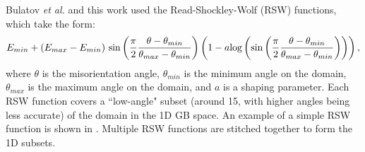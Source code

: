 \documentclass[twoside,senior]{BYUPhys}
\begin{document}
Bulatov \emph{et al.} and this work used the Read-Shockley-Wolf (RSW) functions,\cite{wolf1989} which take the form:
\begin{equation}
E_{min} + (E_{max} - E_{min})\ \textnormal{sin}\left(\frac{\pi}{2}\frac{\theta-\theta_{min}}{\theta_{max} - \theta_{min}}\right)\left(1-a\textnormal{log}\left(\textnormal{sin}\left(\frac{\pi}{2}\frac{\theta-\theta_{min}}{\theta_{max} - \theta_{min}}\right)\right)\right),
\end{equation}
where $\theta$ is the misorientation angle, $\theta_{min}$ is the minimum angle on the domain, $\theta_{max}$ is the maximum angle on the domain, and $a$ is a shaping parameter.  Each RSW function covers a ``low-angle" subset (around 15\textdegree{}, with higher angles being less accurate)\cite{rohrer2011,wolf1989} of the domain in the 1D GB space.  An example of a simple RSW function is shown in .  Multiple RSW functions are stitched together to form the 1D subsets.
\end{document}
